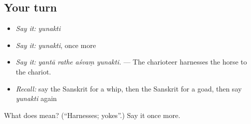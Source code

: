 \subsection*{Your turn}
\begin{itemize}
\raggedright
  \item \emph{Say it:} \emph{yunakti}
  \item \emph{Say it:} \emph{yunakti}, once more
  \item \emph{Say it:} \emph{yantā rathe aśvaṃ yunakti.} — The charioteer harnesses the horse to the chariot.
  \item \emph{Recall:} say the Sanskrit for a whip, then the Sanskrit for a goad, then say \emph{yunakti} again
\end{itemize}

\begin{tcolorbox}[breakable,colback=teal!4,colframe=teal!35!black,title={Before you move on}]
What does  mean? (\textquotedblleft{}Harnesses; yokes\textquotedblright{}.) Say it once more.
\end{tcolorbox}
